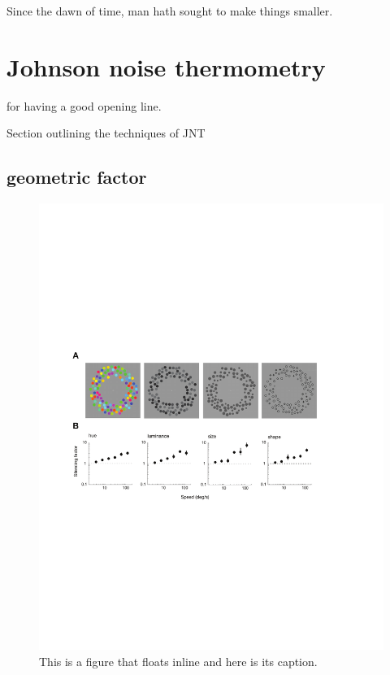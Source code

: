 \begin{savequote}[75mm]
Since the dawn of time, man hath sought to make things smaller.
\end{savequote}

\chapter{Johnson noise thermometry}

 for having a good opening line. 



Section outlining the techniques of JNT
\section{geometric factor}


\begin{figure}
\includegraphics[width=\textwidth]{figures/fig1}
\caption[Short figure name.]{This is a figure that floats inline and here is its caption.
\label{fig:myInlineFigure}}
\end{figure}


